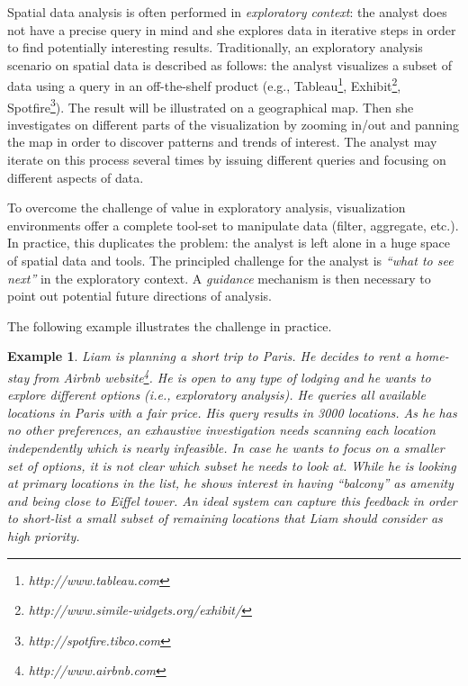 \documentclass[conference,compsoc]{IEEEtran}
\newtheorem{example}{Example}
\begin{document}
Spatial data analysis is often performed in {\em exploratory context}: the analyst does not have a precise query in mind and she explores data in iterative steps in order to find potentially interesting results. Traditionally, an exploratory analysis scenario on spatial data is described as follows: the analyst visualizes a subset of data using a query in an off-the-shelf product (e.g., Tableau\footnote{\it http://www.tableau.com},
 Exhibit\footnote{\it http://www.simile-widgets.org/exhibit/},
Spotfire\footnote{\it http://spotfire.tibco.com}). The result will be illustrated on a geographical map. Then she investigates on different parts of the visualization by zooming in/out and panning the map in order to discover patterns and trends of interest. The analyst may iterate on this process several times by issuing different queries and focusing on different aspects of data. 



To overcome the challenge of value in exploratory analysis, visualization environments offer a complete tool-set to manipulate data (filter, aggregate, etc.). In practice, this duplicates the problem: the analyst is left alone in a huge space of spatial data and tools. The principled challenge for the analyst is {\em ``what to see next''} in the exploratory context. A {\em guidance} mechanism is then necessary to point out potential future directions of analysis.


 

The following example illustrates the challenge in practice.

\begin{example}
\label{ex:airbnb}
Liam is planning a short trip to Paris. He decides to rent a home-stay from Airbnb website\footnote{\it http://www.airbnb.com}. He is open to any type of lodging and he wants to explore different options (i.e., exploratory analysis). He queries all available locations in Paris with a fair price. His query results in 3000 locations. As he has no other preferences, an exhaustive investigation needs scanning each location independently which is nearly infeasible. In case he wants to focus on a smaller set of options, it is not clear which subset he needs to look at. While he is looking at primary locations in the list, he shows interest in having ``balcony'' as amenity and being close to Eiffel tower. An ideal system can capture this feedback in order to short-list a small subset of remaining locations that Liam should consider as high priority.
\end{example}
\end{document}
